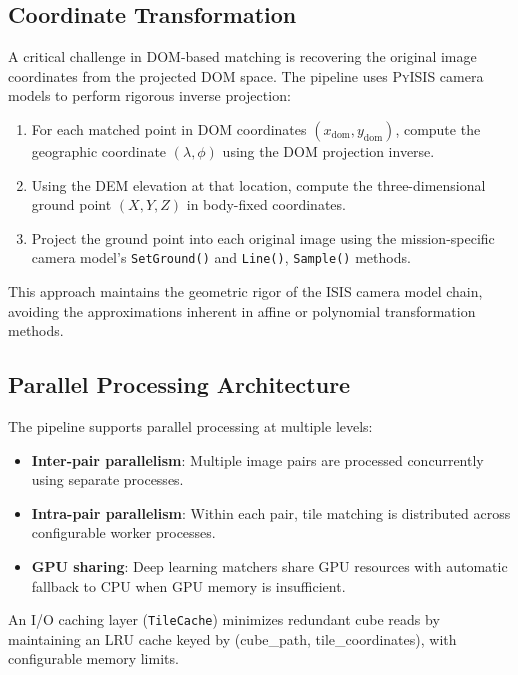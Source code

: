 \documentclass[lettersize,journal]{IEEEtran}
\newcommand{\pyisis}{\textsc{PyISIS}}
\begin{document}
\subsection{Coordinate Transformation}

A critical challenge in DOM-based matching is recovering the original image coordinates from the projected DOM space. The pipeline uses \pyisis{} camera models to perform rigorous inverse projection:

\begin{enumerate}
    \item For each matched point in DOM coordinates $(x_{\text{dom}}, y_{\text{dom}})$, compute the geographic coordinate $(\lambda, \phi)$ using the DOM projection inverse.
    \item Using the DEM elevation at that location, compute the three-dimensional ground point $(X, Y, Z)$ in body-fixed coordinates.
    \item Project the ground point into each original image using the mission-specific camera model's \texttt{SetGround()} and \texttt{Line()}, \texttt{Sample()} methods.
\end{enumerate}

This approach maintains the geometric rigor of the ISIS camera model chain, avoiding the approximations inherent in affine or polynomial transformation methods.

\subsection{Parallel Processing Architecture}

The pipeline supports parallel processing at multiple levels:

\begin{itemize}
    \item \textbf{Inter-pair parallelism}: Multiple image pairs are processed concurrently using separate processes.
    \item \textbf{Intra-pair parallelism}: Within each pair, tile matching is distributed across configurable worker processes.
    \item \textbf{GPU sharing}: Deep learning matchers share GPU resources with automatic fallback to CPU when GPU memory is insufficient.
\end{itemize}

An I/O caching layer (\texttt{TileCache}) minimizes redundant cube reads by maintaining an LRU cache keyed by (cube\_path, tile\_coordinates), with configurable memory limits.
\end{document}
